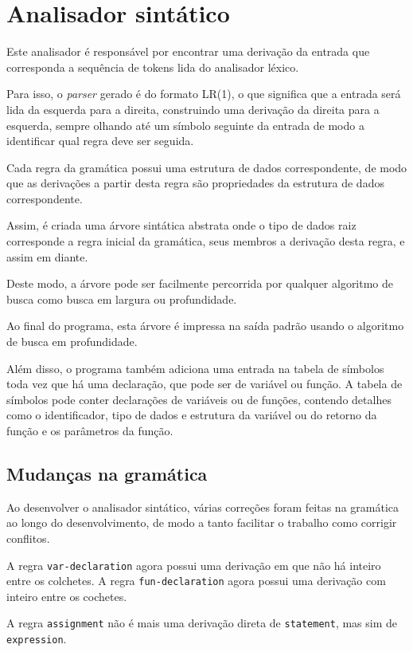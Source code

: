 \documentclass[
	article,			%
	11pt,				%
	oneside,			%
	a4paper,			%
	english,			%
	brazil,				%
	sumario=tradicional
	]{abntex2}
\begin{document}
\section{Analisador sintático}

Este analisador é responsável por encontrar uma derivação da entrada que corresponda a sequência de tokens lida do analisador léxico.

Para isso, o \textit{parser} gerado é do formato LR(1), o que significa que a entrada será lida da esquerda para a direita, construindo uma derivação da direita para a esquerda, sempre olhando até um símbolo seguinte da entrada de modo a identificar qual regra deve ser seguida.

Cada regra da gramática possui uma estrutura de dados correspondente, de modo que as derivações a partir desta regra são propriedades da estrutura de dados correspondente.

Assim, é criada uma árvore sintática abstrata onde o tipo de dados raiz corresponde a regra inicial da gramática, seus membros a derivação desta regra, e assim em diante.

Deste modo, a árvore pode ser facilmente percorrida por qualquer algoritmo de busca como busca em largura ou profundidade. 

Ao final do programa, esta árvore é impressa na saída padrão usando o algoritmo de busca em profundidade.

Além disso, o programa também adiciona uma entrada na tabela de símbolos toda vez que há uma declaração, que pode ser de variável ou função. A tabela de símbolos pode conter declarações de variáveis ou de funções, contendo detalhes como o identificador, tipo de dados e estrutura da variável ou do retorno da função e os parâmetros da função.

\subsection{Mudanças na gramática}

Ao desenvolver o analisador sintático, várias correções foram feitas na gramática ao longo do desenvolvimento, de modo a tanto facilitar o trabalho como corrigir conflitos.

A regra \texttt{var-declaration} agora possui uma derivação em que não há inteiro entre os colchetes. A regra \texttt{fun-declaration} agora possui uma derivação com inteiro entre os cochetes.

A regra \texttt{assignment} não é mais uma derivação direta de \texttt{statement}, mas sim de \texttt{expression}.
\end{document}
